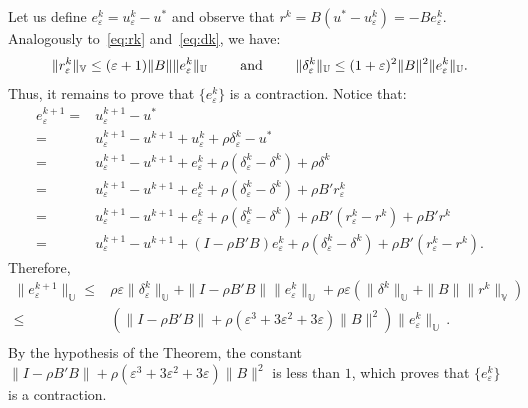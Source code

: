 \documentclass{article}
\theoremstyle{definition}
\begin{document}
Let us define $e^k_\varepsilon= u^k_\varepsilon-u^*$ and observe that $r^k=B(u^*-u^k_\varepsilon)=-Be^k_\varepsilon$. Analogously to~\eqref{eq:rk} and~\eqref{eq:dk}, we have:
$$
\|r^k_\varepsilon\|_\mathbb{V} \leq (\varepsilon+1)\|B\| \|e^k_\varepsilon\|_\mathbb U
\qquad\hbox{ and }\qquad 
\|\delta_\varepsilon^k\|_\mathbb{U}\leq (1+\varepsilon)^2\|B\|^2 \|e^k_\varepsilon\|_\mathbb{U}. 
$$
Thus, it remains to prove that $\{e^k_\varepsilon\}$ is a contraction.
Notice that:
$$
\begin{array}{rl}
e^{k+1}_\varepsilon= & u^{k+1}_\varepsilon-u^*\\
= &  u^{k+1}_\varepsilon-u^{k+1}+u^k_\varepsilon+\rho\delta_\varepsilon^k -u^*\\
= & u^{k+1}_\varepsilon-u^{k+1} + e^k_\varepsilon + \rho(\delta^k_\varepsilon-\delta^k) +\rho \delta^k\\
= & u^{k+1}_\varepsilon-u^{k+1} + e^k_\varepsilon + \rho(\delta^k_\varepsilon-\delta^k) + \rho B'r_\varepsilon^k\\
= & u^{k+1}_\varepsilon-u^{k+1} + e^k_\varepsilon + \rho(\delta^k_\varepsilon-\delta^k) + \rho B'(r_\varepsilon^k-r^k) + \rho B'r^k\\
= & u^{k+1}_\varepsilon-u^{k+1} + (I-\rho B'B)e^k_\varepsilon + \rho(\delta^k_\varepsilon-\delta^k) + \rho B'(r_\varepsilon^k-r^k).
\end{array}
$$
Therefore,
$$
\begin{array}{rl}
\|e^{k+1}_\varepsilon\|_\mathbb{U} \leq & \rho\varepsilon\|\delta_\varepsilon^k\|_\mathbb{U} + \|I-\rho B'B\| \|e^k_\varepsilon\|_\mathbb{U}
+\rho \varepsilon( \|\delta^k\|_\mathbb{U} + \|B\|\|r^k\|_\mathbb{V})\\
\le &  \left(\|I-\rho B'B\|+ \rho (\varepsilon^3+3\varepsilon^2+3\varepsilon)\|B\|^2\right)\|e^k_\varepsilon\|_\mathbb{U}\,.\\
\end{array}
$$
By the hypothesis of the Theorem, the constant $\|I-\rho B'B\|+ \rho (\varepsilon^3+3\varepsilon^2+3\varepsilon)\|B\|^2$ is less than $1$, which proves that $\{e^k_\varepsilon\}$ is a contraction.
\end{document}
